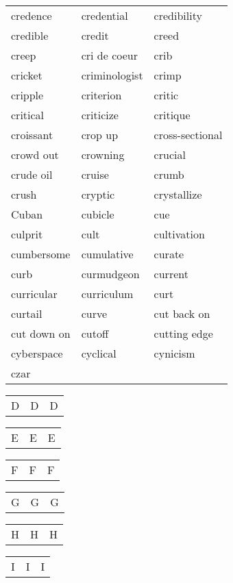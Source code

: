 \documentclass{minimal}
\begin{document}
\begin{longtable}{p{2.8cm}p{2.8cm}p{2.8cm}}
credence & credential & credibility \\
credible & credit & creed \\
creep & cri de coeur & crib \\
cricket & criminologist & crimp \\
cripple & criterion & critic \\
critical & criticize & critique \\
croissant & crop up & cross-sectional \\
crowd out & crowning & crucial \\
crude oil & cruise & crumb \\
crush & cryptic & crystallize \\
Cuban & cubicle & cue \\
culprit & cult & cultivation \\
cumbersome & cumulative & curate \\
curb & curmudgeon & current \\
curricular & curriculum & curt \\
curtail & curve & cut back on \\
cut down on & cutoff & cutting edge \\
cyberspace & cyclical & cynicism \\
czar
\end{longtable}

\begin{longtable}{p{2.8cm}p{2.8cm}p{2.8cm}}
D & D & D
\end{longtable}

\begin{longtable}{p{2.8cm}p{2.8cm}p{2.8cm}}
E & E & E
\end{longtable}

\begin{longtable}{p{2.8cm}p{2.8cm}p{2.8cm}}
F & F & F
\end{longtable}

\begin{longtable}{p{2.8cm}p{2.8cm}p{2.8cm}}
G & G & G
\end{longtable}

\begin{longtable}{p{2.8cm}p{2.8cm}p{2.8cm}}
H & H & H
\end{longtable}

\begin{longtable}{p{2.8cm}p{2.8cm}p{2.8cm}}
I & I & I
\end{longtable}
\end{document}

